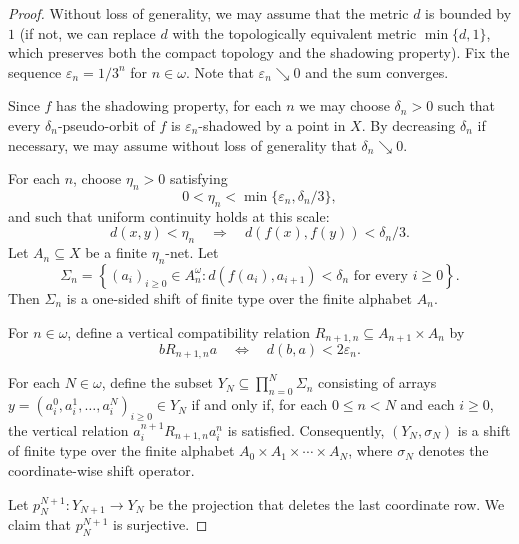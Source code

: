 \documentclass[10pt,a4paper]{amsart}
\numberwithin{equation}{section}
\begin{document}
\begin{proof}
Without loss of generality, we may assume that the metric $d$ is bounded by $1$ (if not, we can replace $d$ with the topologically equivalent metric $\min\{d, 1\}$, which preserves both the compact topology and the shadowing property). Fix the sequence $\varepsilon_n = 1/3^n$ for $n\in\omega$. Note that $\varepsilon_n \searrow 0$ and the sum converges.

Since $f$ has the shadowing property, for each $n$ we may choose $\delta_n>0$ such that every $\delta_n$-pseudo-orbit of $f$ is $\varepsilon_n$-shadowed by a point in $X$. By decreasing $\delta_n$ if necessary, we may assume without loss of generality that $\delta_n \searrow 0$.

For each $n$, choose $\eta_n>0$ satisfying
\begin{equation}\label{eq:eta_bound}
        0 < \eta_n < \min\{\varepsilon_n, \delta_n/3\},
\end{equation}
and such that uniform continuity holds at this scale:
\begin{equation}\label{eq:unif_cont}
        d(x,y) < \eta_n
        \quad\Longrightarrow\quad
        d(f(x),f(y)) < \delta_n/3.
\end{equation}
Let $A_n \subseteq X$ be a finite $\eta_n$-net. Let
\[
        \Sigma_n
        =
        \left\{ (a_i)_{i\geq 0} \in A_n^{\omega} : d(f(a_i),a_{i+1}) < \delta_n \text{ for every } i \geq 0 \right\}.
\]
Then $\Sigma_n$ is a one-sided shift of finite type over the finite alphabet $A_n$. %

For $n\in\omega$, define a vertical compatibility relation $R_{n+1,n} \subseteq A_{n+1} \times A_n$ by
\[
        b \mathrel{R_{n+1,n}} a
        \quad\Longleftrightarrow\quad
        d(b,a) < 2\varepsilon_n.
\]

For each $N\in\omega$, define the subset $Y_N \subseteq \prod_{n=0}^{N} \Sigma_n$ consisting of arrays $y = (a_i^0, a_i^1, \dots, a_i^N)_{i\geq 0} \in Y_N$ if and only if, for each $0 \leq n < N$ and each $i \geq 0$, the vertical relation $a_i^{n+1} \mathrel{R_{n+1,n}} a_i^n$ is satisfied. Consequently, $(Y_N, \sigma_N)$ is a shift of finite type over the finite alphabet $A_0 \times A_1 \times \cdots \times A_N$, where $\sigma_N$ denotes the coordinate-wise shift operator.

Let $p_N^{N+1}: Y_{N+1} \to Y_N$ be the projection that deletes the last coordinate row. We claim that $p_N^{N+1}$ is surjective.


\end{proof}
\end{document}
